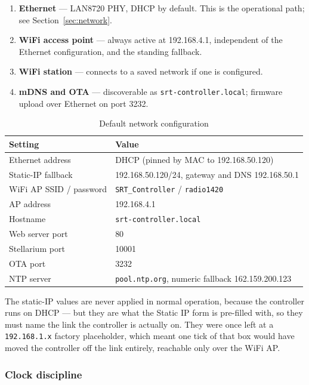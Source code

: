 \documentclass[11pt,a4paper]{article}
\begin{document}
\begin{enumerate}
    \item \textbf{Ethernet} --- LAN8720 PHY, DHCP by default. This is the operational path; see Section~\ref{sec:network}.
    \item \textbf{WiFi access point} --- always active at 192.168.4.1, independent of the Ethernet configuration, and the standing fallback.
    \item \textbf{WiFi station} --- connects to a saved network if one is configured.
    \item \textbf{mDNS and OTA} --- discoverable as \texttt{srt-controller.local}; firmware upload over Ethernet on port 3232.
\end{enumerate}

\begin{table}[H]
\centering
\caption{Default network configuration}
\begin{tabular}{ll}
\toprule
\textbf{Setting} & \textbf{Value} \\
\midrule
Ethernet address & DHCP (pinned by MAC to 192.168.50.120) \\
Static-IP fallback & 192.168.50.120/24, gateway and DNS 192.168.50.1 \\
WiFi AP SSID / password & \texttt{SRT\_Controller} / \texttt{radio1420} \\
AP address & 192.168.4.1 \\
Hostname & \texttt{srt-controller.local} \\
Web server port & 80 \\
Stellarium port & 10001 \\
OTA port & 3232 \\
NTP server & \texttt{pool.ntp.org}, numeric fallback 162.159.200.123 \\
\bottomrule
\end{tabular}
\end{table}

The static-IP values are never applied in normal operation, because the controller runs on DHCP --- but they are what the Static IP form is pre-filled with, so they must name the link the controller is actually on. They were once left at a \texttt{192.168.1.x} factory placeholder, which meant one tick of that box would have moved the controller off the link entirely, reachable only over the WiFi AP.

\subsubsection{Clock discipline}
\end{document}
